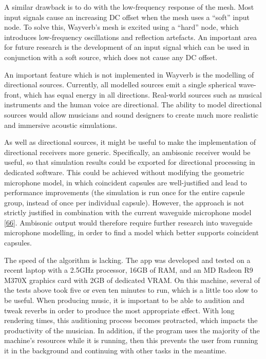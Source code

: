 \documentclass[]{scrreprt}
\begin{document}
A similar drawback is to do with the low-frequency response of the mesh.
Most input signals cause an increasing DC offset when the mesh uses a
``soft'' input node. To solve this, Wayverb's mesh is excited using a
``hard'' node, which introduces low-frequency oscillations and
reflection artefacts. An important area for future research is the
development of an input signal which can be used in conjunction with a
soft source, which does not cause any DC offset.

An important feature which is not implemented in Wayverb is the
modelling of directional sources. Currently, all modelled sources emit a
single spherical wave-front, which has equal energy in all directions.
Real-world sources such as musical instruments and the human voice are
directional. The ability to model directional sources would allow
musicians and sound designers to create much more realistic and
immersive acoustic simulations.

As well as directional sources, it might be useful to make the
implementation of directional receivers more generic. Specifically, an
ambisonic receiver would be useful, so that simulation results could be
exported for directional processing in dedicated software. This could be
achieved without modifying the geometric microphone model, in which
coincident capsules are well-justified and lead to performance
improvements (the simulation is run once for the entire capsule group,
instead of once per individual capsule). However, the approach is not
strictly justified in combination with the current waveguide microphone
model
{[}\protect\hyperlink{ref-hacihabibogluux5fsimulationux5f2010}{66}{]}.
Ambisonic output would therefore require further research into waveguide
microphone modelling, in order to find a model which better supports
coincident capsules.

The speed of the algorithm is lacking. The app was developed and tested
on a recent laptop with a 2.5GHz processor, 16GB of RAM, and an MD
Radeon R9 M370X graphics card with 2GB of dedicated VRAM. On this
machine, several of the tests above took five or even ten minutes to
run, which is a little too slow to be useful. When producing music, it
is important to be able to audition and tweak reverbs in order to
produce the most appropriate effect. With long rendering times, this
auditioning process becomes protracted, which impacts the productivity
of the musician. In addition, if the program uses the majority of the
machine's resources while it is running, then this prevents the user
from running it in the background and continuing with other tasks in the
meantime.
\end{document}
